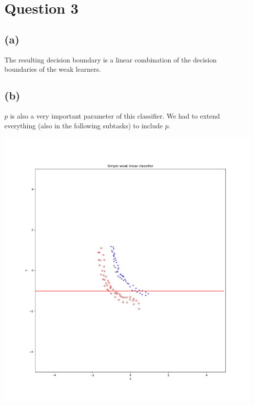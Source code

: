 \section*{Question 3}
\subsection*{(a)}
The resulting decision boundary is a linear combination of the decision boundaries of the weak learners.

\subsection*{(b)}
$p$ is also a very important parameter of this classifier. We had to extend everything (also in the following subtasks) to include $p$.

\includegraphics[width=.5\textwidth]{q3_adaboost_python/Figure_WEAK.png}

